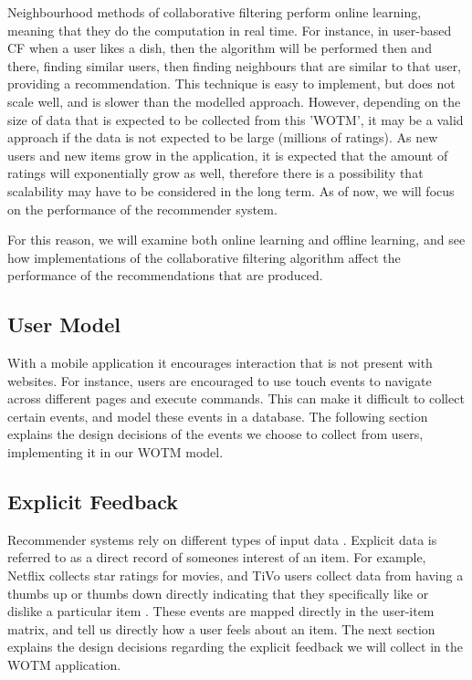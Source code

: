 Neighbourhood methods of collaborative filtering perform online learning, meaning that they do the computation in real time. For instance, in user-based CF when a user likes a dish, then the algorithm will be performed then and there, finding similar users, then finding neighbours that are similar to that user, providing a recommendation. This technique is easy to implement, but does not scale well, and is slower than the modelled approach. However, depending on the size of data that is expected to be collected from this 'WOTM', it may be a valid approach if the data is not expected to be large (millions of ratings). As new users and new items grow in the application, it is expected that the amount of ratings will exponentially grow as well, therefore there is a possibility that scalability may have to be considered in the long term. As of now, we will focus on the performance of the recommender system.  

For this reason, we will examine both online learning and offline learning, and see how implementations of the collaborative filtering algorithm affect the performance of the recommendations that are produced.  


\subsection{User Model}

With a mobile application it encourages interaction that is not present with websites. For instance, users are encouraged to use touch events to navigate across different pages and execute commands. This can make it difficult to collect certain events, and model these events in a database. The following section explains the design decisions of the events we choose to collect from users, implementing it in our WOTM model. 

\subsection{Explicit Feedback}

Recommender systems rely on different types of input data \cite{koren2009matrix}. Explicit data is referred to as a direct record of someones interest of an item. For example, Netflix collects star ratings for movies, and TiVo users collect data from having a thumbs up or thumbs down directly indicating that they specifically like or dislike a particular item \cite{koren2009matrix}. These events are mapped directly in the user-item matrix, and tell us directly how a user feels about an item. 
The next section explains the design decisions regarding the explicit feedback we will collect in the WOTM application.

